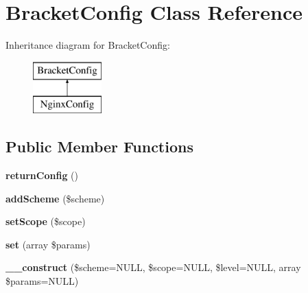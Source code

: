 \hypertarget{class_bracket_config}{
\section{\-Bracket\-Config \-Class \-Reference}
\label{class_bracket_config}
}
\-Inheritance diagram for \-Bracket\-Config\-:\begin{figure}[H]
\begin{center}
\leavevmode
\includegraphics[height=2.000000cm]{class_bracket_config}
\end{center}
\end{figure}
\subsection*{\-Public \-Member \-Functions}
\begin{DoxyCompactItemize}
\item 
\hypertarget{class_bracket_config_af1c51a63a389a43351be05ecc0d1d0e5}{
{\bfseries return\-Config} ()}
\label{class_bracket_config_af1c51a63a389a43351be05ecc0d1d0e5}

\item 
\hypertarget{class_bracket_config_aa8986047ac0c180a616c2d4a1f01b4f2}{
{\bfseries add\-Scheme} (\$scheme)}
\label{class_bracket_config_aa8986047ac0c180a616c2d4a1f01b4f2}

\item 
\hypertarget{class_bracket_config_a34b78f906f96dba1368e226dfaf3ebc4}{
{\bfseries set\-Scope} (\$scope)}
\label{class_bracket_config_a34b78f906f96dba1368e226dfaf3ebc4}

\item 
\hypertarget{class_bracket_config_abcc82156be4ee9a19d38b8285b1dfd6a}{
{\bfseries set} (array \$params)}
\label{class_bracket_config_abcc82156be4ee9a19d38b8285b1dfd6a}

\item 
\hypertarget{class_bracket_config_a9959bab432fb2a8a66116fcbc54732b3}{
{\bfseries \-\_\-\-\_\-construct} (\$scheme=\-N\-U\-L\-L, \$scope=\-N\-U\-L\-L, \$level=\-N\-U\-L\-L, array \$params=\-N\-U\-L\-L)}
\label{class_bracket_config_a9959bab432fb2a8a66116fcbc54732b3}

\end{DoxyCompactItemize}

